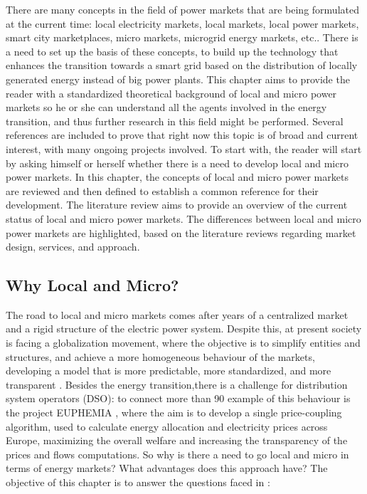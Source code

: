 There are many concepts in the field of power markets that are being formulated at the current time: local electricity markets, local markets, local power markets, smart city marketplaces, micro markets, microgrid energy markets, etc.. There is a need to set up the basis of these concepts, to build up the technology that enhances the transition towards a smart grid based on the distribution of locally generated energy instead of big power plants.
This chapter aims to provide the reader with a standardized theoretical background of local and micro power markets so he or she can understand all the agents involved in the energy transition, and thus further research in this field might be performed. Several references are included to prove that right now this topic is of broad and current interest, with many ongoing projects involved.
To start with, the reader will start by asking himself or herself whether there is a need to develop local and micro power markets.
In this chapter, the concepts of local and micro power markets are reviewed and then defined to establish a common reference for their development. The literature review aims to provide an overview of the current status of local and micro power markets. The differences between local and micro power markets are highlighted, based on the literature reviews regarding market design, services, and approach.

\subsection{Why Local and Micro?}
The road to local and micro markets comes after years of a centralized market and a rigid structure of the electric power system. Despite this, at present society is facing a globalization movement, where the objective is to simplify entities and structures, and achieve a more homogeneous behaviour of the markets, developing a model that is more predictable, more standardized, and more transparent \cite{Mallet2014}. Besides the energy transition,there is a challenge for distribution system operators (DSO): to connect more than 90%
example of this behaviour is the project EUPHEMIA \cite{EUPHEMIA2016}, where the aim is to develop a single price-coupling algorithm, used to calculate energy allocation and electricity prices across Europe, maximizing the overall welfare and increasing the transparency of the prices and flows computations. So why is there a need to go local and micro in terms of energy markets? What advantages does this approach have? The objective of this chapter is to answer the questions faced in \cite{DesignElectricityMarketRossetoo2017}:

